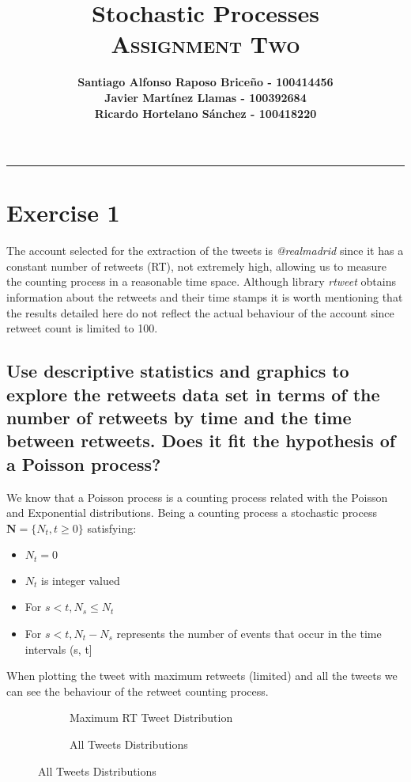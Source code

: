 \documentclass[11pt, a4paper]{article}
\title{\vspace{-8ex} \huge \bfseries Stochastic Processes\\
	\LARGE \normalfont \textsc{Assignment Two} \vspace{-2ex}}
\author{\bfseries Santiago Alfonso Raposo Briceño - 100414456 \\
	\bfseries Javier Martínez Llamas - 100392684\\
	\bfseries Ricardo Hortelano Sánchez - 100418220}
\date{\vspace{-5ex}} %
\begin{document}
	\maketitle
	\hrule

\section{Exercise 1}

The account selected for the extraction of the tweets is \textit{@realmadrid} since it has a constant number of retweets (RT), not extremely high, allowing us to measure the counting process in a reasonable time space. 
Although library \textit{rtweet} obtains information about the retweets and their time stamps it is worth mentioning that the results detailed here do not reflect the actual behaviour of the account since retweet count is limited to 100.

\subsection{Use descriptive statistics and graphics to explore the retweets data set in terms of the number of retweets by time and the time between retweets. Does it fit the hypothesis of a Poisson process?}

We know that a Poisson process is a counting process related with the Poisson and Exponential distributions. 
Being a counting process a stochastic process $\mathbf{N} = \{ N_t, t \geq 0 \}$ satisfying:
\begin{itemize}
	\item $N_t=0$
	\item $N_t$ is integer valued
	\item For $s<t, N_s \leq N_t$
	\item For $s<t, N_t - N_s$ represents the number of events that occur in the time intervals (s, t]
\end{itemize}

When plotting the tweet with maximum retweets (limited) and all the tweets we can see the behaviour of the retweet counting process.

\begin{figure}[H]
	\centering
	\begin{subfigure}{.5\textwidth}
		\centering
		
		\caption{Maximum RT Tweet Distribution}
		\label{fig:rtMax}
	\end{subfigure}%
	\begin{subfigure}{.5\textwidth}
		\centering
		\vspace*{-3em}
		
		\vspace*{-1.4em}
		\caption{All Tweets Distributions}
		\label{fig:rtAll}
	\end{subfigure}
\end{figure}
\end{document}
